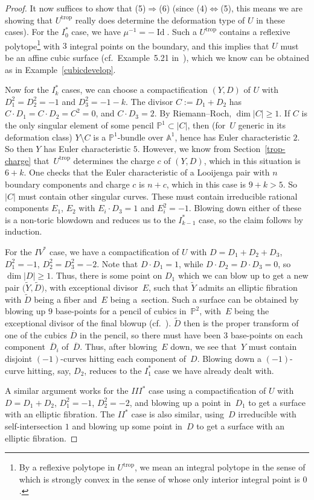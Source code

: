 \documentclass[11pt]{article}
\numberwithin{equation}{section}
\numberwithin{figure}{section}
\numberwithin{table}{section}
\DeclareMathOperator{\Id}{Id}
\DeclareMathOperator{\trop}{trop}
\let\?=\overline
\let\bb=\mathbb
\let\wt=\widetilde
\theoremstyle{definition}
\begin{document}
\begin{proof}
It now suffices to show that (5)$\Rightarrow$(6) (since (4)$\Leftrightarrow$(5), this means we are showing that $U^{\trop}$ really does determine the deformation type of $U$ in these cases). For the $I_0^*$ case, we have $\mu^{-1}=-\Id$. Such a $U^{\trop}$ contains a reflexive polytope\footnote{By a reflexive polytope in $U^{\trop}$, we mean an integral polytope in the sense of \cite[Definition~2.10]{Man1} which is strongly convex in the sense of \cite[Definition~5.4]{Man1} whose only interior integral point is $0$.} with $3$ integral points on the boundary, and this implies that $U$ must be an affine cubic surface (cf.\ Example~5.21 in~\cite{Man1}), which we know can be obtained as in Example~\ref{cubicdevelop}.

Now for the $I_k^*$ cases, we can choose a compactification $(Y,D)$ of $U$ with $D_1^2=D_2^2=-1$ and $D_3^2=-1-k$. The divisor $C:=D_1+D_2$ has $C\cdot D_1=C\cdot D_2 = C^2 = 0$, and $C\cdot D_3 = 2$. By Riemann--Roch, $\dim |C|\geq 1$. If $C$ is the only singular element of some pencil $\bb{P}^1\subset |C|$, then (for~$U$ generic in its deformation class) $Y\setminus C$ is a $\bb{P}^1$-bundle over $\bb{A}^1$, hence has Euler characteristic $2$. So then $Y$ has Euler characteristic $5$. However, we know from Section~\ref{trop-charge} that~$U^{\trop}$ determines the charge $c$ of $(Y,D)$, which in this situation is $6+k$. One checks that the Euler characteristic of a Looijenga pair with $n$ boundary components and charge $c$ is $n+c$, which in this case is $9+k > 5$. So $|C|$ must contain other singular curves. These must contain irreducible rational components $E_1$, $E_2$ with $E_i\cdot D_3 = 1$ and $E_i^2=-1$. Blowing down either of these is a non-toric blowdown and reduces us to the $I_{k-1}^*$ case, so the claim follows by induction.

For the $IV^*$ case, we have a compactification of $U$ with $D=D_1+D_2+D_3$, $D_1^2=-1$, $D_2^2=D_3^2 = -2$. Note that $D\cdot D_1=1$, while $D\cdot D_2=D\cdot D_3 = 0$, so $\dim |D|\geq 1$. Thus, there is some point on $D_1$ which we can blow up to get a new pair $\big(\wt{Y},\wt{D}\big)$, with exceptional divisor~$E$, such that $\wt{Y}$ admits an elliptic fibration with $\wt{D}$ being a fiber and~$E$ being a~section. Such a surface can be obtained by blowing up $9$ base-points for a pencil of cubics in~$\bb{P}^2$, with~$E$ being the exceptional divisor of the final blowup (cf.~\cite{HL}). $\wt{D}$ then is the proper transform of one of the cubics $\?{D}$ in the pencil, so there must have been $3$ base-points on each component~$\?{D}_i$ of~$\?{D}$. Thus, after blowing~$E$ down, we see that~$Y$ must contain disjoint $(-1)$-curves hitting each component of~$D$. Blowing down a $(-1)$-curve hitting, say, $D_2$, reduces to the $I_1^*$ case we have already dealt with.

A similar argument works for the $III^*$ case using a compactification of $U$ with $D=D_1+D_2$, $D_1^2=-1$, $D_2^2 = -2$, and blowing up a point in~$D_1$ to get a surface with an elliptic fibration. The $II^*$ case is also similar, using~$D$ irreducible with self-intersection $1$ and blowing up some point in~$D$ to get a surface with an elliptic fibration.
\end{proof}
\end{document}
